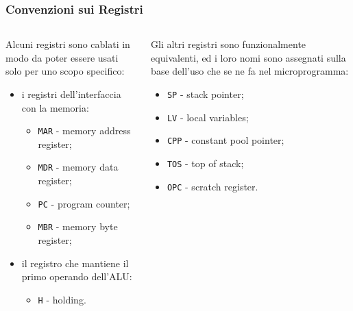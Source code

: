 \documentclass{beamer}
\begin{document}
\begin{frame}
  \frametitle{Convenzioni sui Registri}
  \begin{columns}
    \begin{column}{0.5\textwidth}
  Alcuni registri sono cablati in modo da poter essere usati solo per uno scopo
  specifico:
  \begin{itemize}
    \item i registri dell'interfaccia con la memoria:
    \begin{itemize}
      \item \lstinline{MAR} - memory address register;
      \item \lstinline{MDR} - memory data register;
      \item \lstinline{PC} - program counter;
      \item \lstinline{MBR} - memory byte register;
    \end{itemize}
    \item il registro che mantiene il primo operando dell'ALU:
    \begin{itemize}
      \item \lstinline{H} - holding.
    \end{itemize}
  \end{itemize}
  \end{column}

  \begin{column}{0.5\textwidth}
    Gli altri registri sono funzionalmente equivalenti, ed i loro nomi sono
    assegnati sulla base dell'uso che se ne fa nel microprogramma:
  \begin{itemize}
    \item \lstinline{SP} - stack pointer;
    \item \lstinline{LV} - local variables;
    \item \lstinline{CPP} - constant pool pointer;
    \item \lstinline{TOS} - top of stack;
    \item \lstinline{OPC} - scratch register.
  \end{itemize}
\end{column}
\end{columns}
\end{frame}
\end{document}
